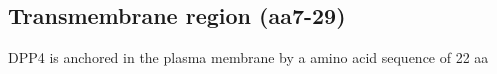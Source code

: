 \subsection{Transmembrane region (aa7-29)}

DPP4 is anchored in the plasma membrane by a amino acid sequence of 22 aa